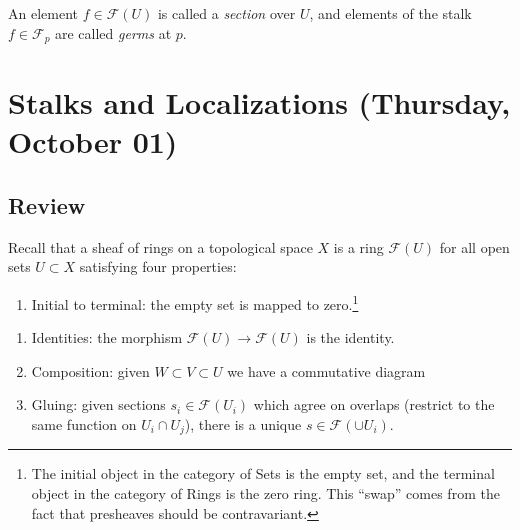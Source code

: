\begin{definition}

An element \(f\in \mathcal{F}(U)\) is called a \emph{section} over
\(U\), and elements of the stalk \(f\in \mathcal{F}_p\) are called
\emph{germs} at \(p\).

\end{definition}

\hypertarget{stalks-and-localizations-thursday-october-01}{%
\section{Stalks and Localizations (Thursday, October
01)}\label{stalks-and-localizations-thursday-october-01}}

\hypertarget{review}{%
\subsection{Review}\label{review}}

Recall that a sheaf of rings on a topological space \(X\) is a ring
\(\mathcal{F}(U)\) for all open sets \(U\subset X\) satisfying four
properties:

\begin{enumerate}
\def\labelenumi{\arabic{enumi}.}
\tightlist
\item
  Initial to terminal: the empty set is mapped to zero.\footnote{The
    initial object in the category of Sets is the empty set, and the
    terminal object in the category of Rings is the zero ring. This
    ``swap'' comes from the fact that presheaves should be
    contravariant.}
\end{enumerate}

\begin{enumerate}
\def\labelenumi{\arabic{enumi}.}
\setcounter{enumi}{1}
\item
  Identities: the morphism \(\mathcal{F}(U)\to \mathcal{F}(U)\) is the
  identity.
\item
  Composition: given \(W\subset V\subset U\) we have a commutative
  diagram

  \begin{center}
  \end{center}
\item
  Gluing: given sections \(s_i \in\mathcal{F}(U_i)\) which agree on
  overlaps (restrict to the same function on \(U_i\cap U_j\)), there is
  a unique \(s\in \mathcal{F}(\cup U_i)\).
\end{enumerate}

